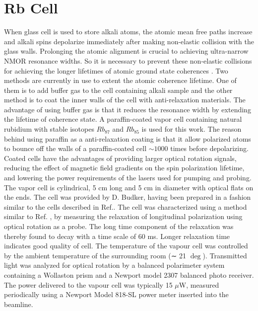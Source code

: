 \documentclass[12pt]{report}
\begin{document}
\section{Rb Cell}
When glass cell is used to store alkali atoms, the atomic mean free paths increase and alkali spins depolarize immediately after making non-elastic collision with the glass walls.
Prolonging the atomic alignment is crucial to achieving ultra-narrow NMOR
resonance widths. So it is necessary to prevent these non-elastic collisions for achieving the longer lifetimes of atomic ground state coherences \cite{PhysRevA.72.023401}\cite{Balabas:10}  \cite{doi:10.1063/1.3236649}. Two methods are currently in use to extent the atomic coherence lifetime. One of them is to add buffer gas to the cell containing alkali sample and the other method is to coat the inner walls of the cell with anti-relaxation materials. The advantage of using buffer gas is that it reduces the resonance width by extending the lifetime of coherence state. A paraffin-coated vapor cell containing  natural rubidium with stable isotopes $Rb_{87}$ and $Rb_{85}$ is used for this work. The reason behind using paraffin as a anti-relaxation coating is that it allow polarized atoms to bounce off the walls of a paraffin-coated cell $\sim 1000$ times before depolarizing\cite{PhysRev.147.41}\cite{PhysRevA.72.023401}. Coated cells have the advantages of providing larger optical rotation
signals, reducing the effect of magnetic field gradients on the spin polarization lifetime,
and lowering the power requirements of the lasers used for pumping and probing. The vapor cell is cylindrical, 5 cm long and 5 cm in diameter with optical
flats on the ends. The cell was provided by D. Budker, having been prepared in
a fashion similar to the cells described in Ref.\cite{PhysRevA.72.023401}. The cell was characterized
using a method similar to Ref. \cite{PhysRevA.72.023401}, by measuring the relaxation of longitudinal
polarization using optical rotation as a probe. The long time component of the
relaxation was thereby found to decay with a time scale of 60 ms.  Longer relaxation time indicates good quality of cell. The temperature of the vapour cell was controlled by the ambient temperature of the surrounding room (∼ 21 $\deg$). Transmitted light was analyzed for optical rotation by a balanced polarimeter system containing a Wollaston prism and a Newport model 2307 balanced photo receiver. The power delivered to the vapour cell was typically 15 $\mu$W, measured periodically using a Newport Model 818-SL power meter inserted into the
beamline. 
\end{document}
